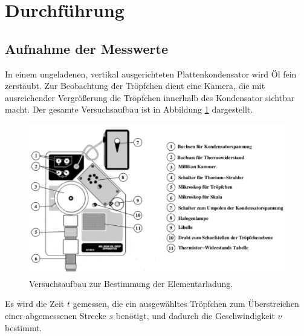 \section{Durchf\"uhrung}
\label{sec:Durchfuehrung}

\subsection{Aufnahme der Messwerte}
In einem ungeladenen, vertikal ausgerichteten Plattenkondensator wird Öl fein zerstäubt.
Zur Beobachtung der Tröpfchen dient eine Kamera, die mit ausreichender Vergrößerung die Tröpfchen innerhalb des Kondensator sichtbar macht. Der gesamte Versuchsaufbau ist in Abbildung \ref{fig:aufbau} dargestellt.

\begin{figure}
	\centering
	\includegraphics[width=\textwidth]{Bilder/aufbau.pdf}
	\caption{Versuchsaufbau zur Bestimmung der Elementarladung.}
	\label{fig:aufbau}
\end{figure}

Es wird die Zeit $t$ gemessen, die ein ausgewähltes Tröpfchen zum Überstreichen einer abgemessenen Strecke $s$ benötigt, und  dadurch die Geschwindigkeit $v$ bestimmt.

